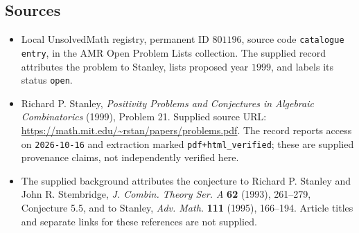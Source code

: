 \documentclass[11pt]{article}
\begin{document}
\subsection{Sources}
\begin{itemize}
\item Local UnsolvedMath registry, permanent ID \(801196\), source code \texttt{catalogue entry}, in the AMR Open Problem Lists collection. The supplied record attributes the problem to Stanley, lists proposed year \(1999\), and labels its status \texttt{open}.
\item Richard P. Stanley, \emph{Positivity Problems and Conjectures in Algebraic Combinatorics} (1999), Problem 21. Supplied source URL: \url{https://math.mit.edu/~rstan/papers/problems.pdf}. The record reports access on \texttt{2026-10-16} and extraction marked \texttt{pdf+html\_verified}; these are supplied provenance claims, not independently verified here.
\item The supplied background attributes the conjecture to Richard P. Stanley and John R. Stembridge, \emph{J. Combin. Theory Ser. A} \textbf{62} (1993), 261--279, Conjecture 5.5, and to Stanley, \emph{Adv. Math.} \textbf{111} (1995), 166--194. Article titles and separate links for these references are not supplied.
\end{itemize}
\end{document}
